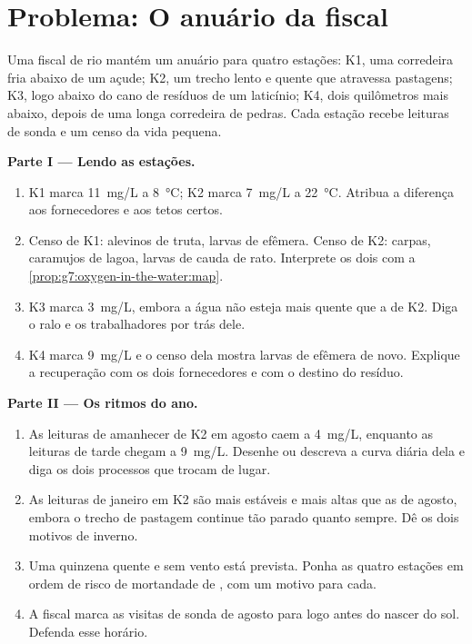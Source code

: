 \section{Problema: O anuário da fiscal}

\begin{problem}\label{pb:g7:oxygen-in-the-water:1}
Uma fiscal de rio mantém um anuário para quatro estações: K1, uma
corredeira fria abaixo de um açude; K2, um trecho lento e quente que
atravessa pastagens; K3, logo abaixo do cano de resíduos de um
laticínio; K4, dois quilômetros mais abaixo, depois de uma longa
corredeira de pedras. Cada estação recebe leituras de sonda e um censo
da vida pequena.

\medskip\noindent\textbf{Parte I --- Lendo as estações.}
\begin{enumerate}
  \item K1 marca \qty{11}{mg/L} a \qty{8}{\degreeCelsius}; K2 marca
        \qty{7}{mg/L} a \qty{22}{\degreeCelsius}. Atribua a diferença
        aos fornecedores e aos tetos certos.
  \item Censo de K1: alevinos de truta, larvas de efêmera. Censo de
        K2: carpas, caramujos de lagoa, larvas de cauda de rato.
        Interprete os dois com a
        \cref{prop:g7:oxygen-in-the-water:map}.
  \item K3 marca \qty{3}{mg/L}, embora a água não esteja mais quente
        que a de K2. Diga o ralo e os trabalhadores por trás dele.
  \item K4 marca \qty{9}{mg/L} e o censo dela mostra larvas de efêmera
        de novo. Explique a recuperação com os dois fornecedores e com
        o destino do resíduo.
\end{enumerate}

\medskip\noindent\textbf{Parte II --- Os ritmos do ano.}
\begin{enumerate}[resume]
  \item As leituras de amanhecer de K2 em agosto caem a
        \qty{4}{mg/L}, enquanto as leituras de tarde chegam a
        \qty{9}{mg/L}. Desenhe ou descreva a curva diária dela e diga
        os dois processos que trocam de lugar.
  \item As leituras de janeiro em K2 são mais estáveis e mais altas
        que as de agosto, embora o trecho de pastagem continue tão
        parado quanto sempre. Dê os dois motivos de inverno.
  \item Uma quinzena quente e sem vento está prevista. Ponha as quatro
        estações em ordem de risco de mortandade de , com um
        motivo para cada.
  \item A fiscal marca as visitas de sonda de agosto para logo antes
        do nascer do sol. Defenda esse horário.
\end{enumerate}


\end{problem}
